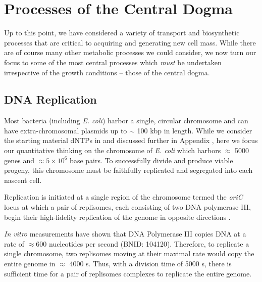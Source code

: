 \section{Processes of the Central Dogma}
Up to this point, we have considered a variety of transport and biosynthetic
processes that are critical to acquiring and generating new cell mass. While
there are of course many other metabolic processes we could consider, we now
turn our focus to some of the most central processes which \textit{must} be
undertaken irrespective of the growth conditions -- those of the central
dogma.

\subsection{DNA Replication}
Most bacteria (including \textit{E. coli}) harbor a single, circular chromosome
and can have extra-chromosomal plasmids up to $\sim$ 100 kbp in length. While
we consider the starting material dNTPs in  and
discussed further in Appendix , here we focus
our quantitative thinking on the chromosome of \textit{E. coli} which
harbors $\approx$ 5000 genes and $\approx 5\times 10^6$ base pairs. To
successfully divide and produce viable progeny, this chromosome must be
faithfully replicated and segregated into each nascent cell.


Replication is initiated at a single region of the chromosome termed the
\textit{oriC} locus at which a pair of replisomes, each consisting of two DNA polymerase III, begin their
high-fidelity replication of the genome in opposite directions
\citep{fijalkowska2012}.

\textit{In vitro} measurements have shown that DNA
Polymerase III copies DNA at a rate of $\approx 600$ nucleotides per second
(BNID: 104120). Therefore, to replicate a single chromosome, two replisomes
moving at their maximal rate would copy
the entire genome in $\approx$ 4000 s. Thus, with a division time of 5000 s,
there is sufficient time for a pair of replisomes complexes to replicate the entire genome.


